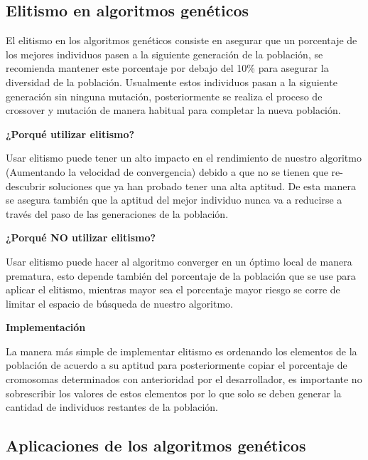 \documentclass[11pt,fleqn]{book} %
\begin{document}
\subsection{Elitismo en algoritmos genéticos} 

El elitismo en los algoritmos genéticos consiste en asegurar que un porcentaje de los mejores individuos pasen a la siguiente generación de la población, se recomienda mantener este porcentaje por debajo del 10\% para asegurar la diversidad de la población. Usualmente estos individuos pasan a la siguiente generación sin ninguna mutación, posteriormente se realiza el proceso de crossover y mutación de manera habitual para completar la nueva población.

\textbf{¿Porqué utilizar elitismo?}

Usar elitismo puede tener un alto impacto en el rendimiento de nuestro algoritmo (Aumentando la velocidad de convergencia) \cite{rani2019effectiveness} debido a que no se tienen que re-descubrir soluciones que ya han probado tener una alta aptitud. De esta manera se asegura también que la aptitud del mejor individuo nunca va a reducirse a través del paso de las generaciones de la población.

\textbf{¿Porqué NO utilizar elitismo?}

Usar elitismo puede hacer al algoritmo converger en un óptimo local de manera prematura, esto depende también del porcentaje de la población que se use para aplicar el elitismo, mientras mayor sea el porcentaje mayor riesgo se corre de limitar el espacio de búsqueda de nuestro algoritmo.

\textbf{Implementación}

La manera más simple de implementar elitismo es ordenando los elementos de la población de acuerdo a su aptitud para posteriormente copiar el porcentaje de cromosomas determinados con anterioridad por el desarrollador, es importante no sobrescribir los valores de estos elementos por lo que solo se deben generar la cantidad de individuos restantes de la población.

\subsection{Aplicaciones de los algoritmos genéticos} 
\end{document}
